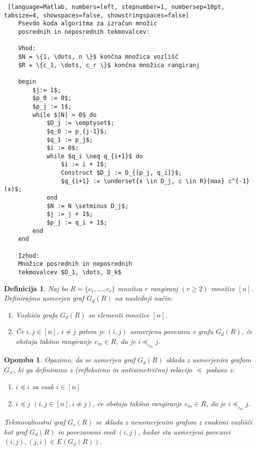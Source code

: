 \documentclass[a4paper, 12pt]{book}
\newtheorem{definicija}{Definicija}[chapter]
\newtheorem{opomba}{Opomba}[chapter]
\begin{document}
\begin{minipage}{\linewidth}    
\begin{lstlisting} [language=Matlab, numbers=left, stepnumber=1, numbersep=10pt, tabsize=4, showspaces=false, showstringspaces=false]
    Psevdo koda algoritma za izračun množic 
    posrednih in neposrednih tekmovalcev:

    Vhod:
    $N = \{1, \dots, n \}$ končna množica vozlišč
    $R = \{c_1, \dots, c_r \}$ končna množica rangiranj
    
    begin
        $j:= 1$;
        $p_0 := 0$;
        $p_j := 1$;
        while $|N| > 0$ do
            $D_j := \emptyset$;
            $q_0 := p_{j-1}$;
            $q_1 := p_j$;
            $i := 0$;
            while $q_i \neq q_{i+1}$ do
                $i := i + 1$;
                Construct $D_j := D_{[p_j, q_i]}$;
                $q_{i+1} := \underset{x \in D_j, c \in R}{max} c^{-1}(x)$;
            end
            $N := N \setminus D_j$;
            $j := j + 1$;
            $p_j := q_i + 1$;
        end
    end
    
    Izhod: 
    Množice posrednih in neposrednih 
    tekmovalcev $D_1, \dots, D_k$
\end{lstlisting}
\end{minipage}

\begin{definicija}
    Naj bo $R = \{ c_1, \dots, c_r \}$ množica $r$ rangiranj $(r \geq 2)$ množice $[n]$. Definirajmo usmerjen graf $G_d(R)$  na naslednji način:
    \begin{enumerate}[label=(\roman*)]
        \item Vozlišča grafa $G_d(R)$ so elementi množice $[n]$.
        \item Če $i, j \in [n]$, $i \neq j$ potem je $(i, j)$ usmerjena povezava v grafu $G_d(R)$, če obstaja takšno rangiranje $c_m \in R$, da je $i \preceq_{c_m} j$.
    \end{enumerate}
\end{definicija}

\begin{opomba}
    Opazimo, da se usmerjen graf $G_d(R)$ sklada z usmerjenim grafom $G_{\preceq}$, ki ga definiramo z (refleksivno in antisimetrično) relacijo $\preceq$ podano z:
    \begin{enumerate}[label=(\roman*)]
        \item $i \preceq i$ za vsak $i \in [n]$
        \item $i \preceq j$ $(i,j \in [n], i \neq j)$, če obstaja takšno rangiranje $c_m \in R$, da je $i \preceq_{c_m} j$.
    \end{enumerate}
    Tekmovalnostni graf $G_c(R)$ se sklada z neusmerjenim grafom z enakimi vozlišči kot graf $G_d(R)$ in povezavami med $(i, j)$, kadar sta usmerjeni povezavi $(i, j), (j, i) \in E(G_d(R))$.
\end{opomba}
\end{document}
